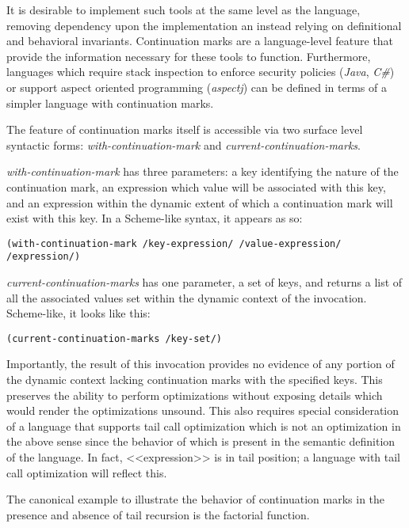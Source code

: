 \documentclass[ms]{byuprop}
\newcounter{definition}
\newcounter{example}
\begin{document}
It is desirable to implement such tools at the same level as the language, removing
dependency upon the implementation an instead relying on definitional and behavioral
invariants. Continuation marks are a language-level feature that provide the information
necessary for these tools to function. Furthermore, languages which require stack
inspection to enforce security policies (\emph{Java}, \emph{C\#}) or support aspect
oriented programming (\emph{aspectj}) can be defined in terms of a simpler language with
continuation marks.

The feature of continuation marks itself is accessible via two surface level syntactic
forms: \emph{with-continuation-mark} and \emph{current-continuation-marks}.

\emph{with-continuation-mark} has three parameters: a key identifying the nature of the
continuation mark, an expression which value will be associated with this key, and an
expression within the dynamic extent of which a continuation mark will exist with this
key. In a Scheme-like syntax, it appears as so:

\begin{verbatim}
(with-continuation-mark /key-expression/ /value-expression/ /expression/)
\end{verbatim}

\emph{current-continuation-marks} has one parameter, a set of keys, and returns a list of
all the associated values set within the dynamic context of the invocation. Scheme-like,
it looks like this:

\begin{verbatim}
(current-continuation-marks /key-set/)
\end{verbatim}

Importantly, the result of this invocation provides no evidence of any portion of the
dynamic context lacking continuation marks with the specified keys. This preserves the
ability to perform optimizations without exposing details which would render the
optimizations unsound. This also requires special consideration of a language that
supports tail call optimization which is not an optimization in the above sense since the
behavior of which is present in the semantic definition of the language. In fact, 
<<expression>> is in tail position; a language with tail call optimization will reflect 
this.

The canonical example to illustrate the behavior of continuation marks in the presence and
absence of tail recursion is the factorial function.
\end{document}
